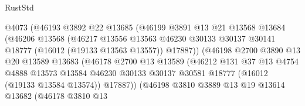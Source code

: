 \begin{lexlean}{RustStd}
\begin{coremodule}
                              @4073
                              (@46193
                                @3892
                                @22
                                @13685
                                (@46199
                                  @3891
                                  @13
                                  @21
                                  @13568
                                  @13684
                                  (@46206
                                    @13568
                                    (@46217
                                      @13556
                                      @13563
                                      @46230
                                      @30133
                                      @30137
                                      @30141
                                      @18777
                                      (@16012 (@19133 @13563 @13557))
                                      @17887))
                                  (@46198
                                    @2700
                                    @3890
                                    @13
                                    @20
                                    @13589
                                    @13683
                                    (@46178
                                      @2700
                                      @13
                                      @13589
                                      (@46212
                                        @131
                                        @37
                                        @13
                                        @4754
                                        @4888
                                        @13573
                                        @13584
                                        @46230
                                        @30133
                                        @30137
                                        @30581
                                        @18777
                                        (@16012 (@19133 @13584 @13574))
                                        @17887))
                                    (@46198
                                      @3810
                                      @3889
                                      @13
                                      @19
                                      @13614
                                      @13682
                                      (@46178
                                        @3810
                                        @13

\end{coremodule}
\end{lexlean}

